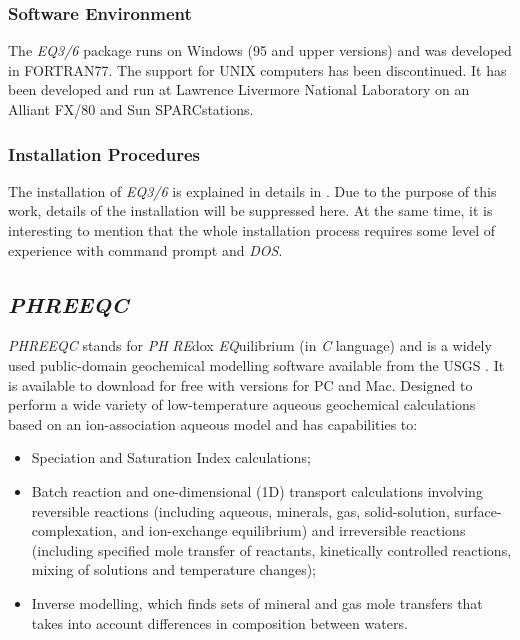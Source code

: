 \documentclass[ppgc,mestrado,English]{iiufrgs}
\begin{document}
\subsubsection{Software Environment}
The \emph{EQ3/6} package runs on Windows (95 and upper versions) and was developed in FORTRAN77. The support for UNIX computers has been discontinued.  It has been developed and run at Lawrence Livermore National Laboratory on an Alliant FX/80 and Sun SPARCstations.
\subsubsection{Installation Procedures}
The installation of \emph{EQ3/6} is explained in details in \cite{Wolery:92}. Due to the purpose of this work, details of the installation will be suppressed here. At the same time, it is interesting to mention that the whole installation process requires some level of experience with command prompt and \emph{DOS}.

\subsection{\emph{PHREEQC}}
\emph{PHREEQC} stands for \emph{PH} \emph{RE}dox \emph{EQ}uilibrium (in \emph{C} language) and is a widely used public-domain geochemical modelling software available from the USGS  \cite{Parkhurst:80}. It is available to download for free with versions for PC and Mac. Designed to perform a wide variety of low-temperature aqueous geochemical calculations based on an ion-association aqueous model and has capabilities to:
\begin{itemize}
\item Speciation and Saturation Index calculations;
\item Batch reaction and one-dimensional (1D) transport calculations involving reversible reactions (including aqueous, minerals, gas, solid-solution, surface-complexation, and ion-exchange equilibrium) and irreversible reactions (including specified mole transfer of reactants, kinetically controlled reactions, mixing of solutions and temperature changes);
\item Inverse modelling, which finds sets of mineral and gas mole transfers that takes into account differences in composition between waters.
\end{itemize}
\end{document}
